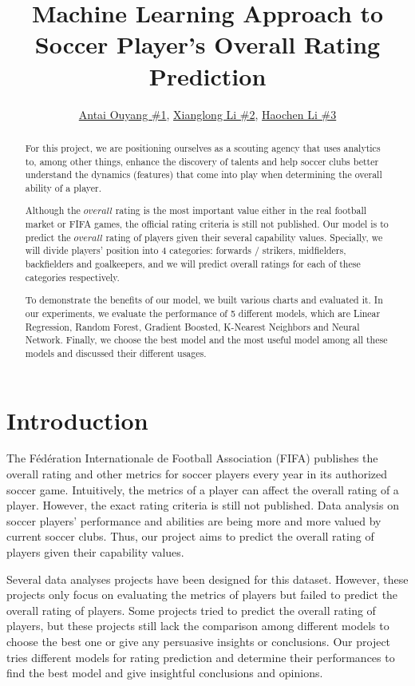 \documentclass{article}
\title{Machine Learning Approach to Soccer Player's Overall Rating Prediction}
\author{\href{mailto:ao2186@nyu.edu}{Antai Ouyang \#1}, \href{mailto:xl3215@nyu.edu}{Xianglong Li \#2}, \href{mailto:hl4151@nyu.edu}{Haochen Li \#3}}
\date{\vspace{-5ex}} %
\begin{document}
\maketitle
\thispagestyle{firstpage}


\begin{abstract}
    
    
    For this project, we are positioning ourselves as a scouting agency that uses analytics to, among other things, enhance the discovery of talents and help soccer clubs better understand the dynamics (features) that come into play when determining the overall ability of a player. 
    
    Although the $overall$ rating is the most important value either in the real football market or FIFA games, the official rating criteria is still not published. Our model is to predict the $overall$ rating of players given their several capability values. Specially, we will divide players' position into 4 categories: forwards / strikers, midfielders, backfielders and goalkeepers, and we will predict overall ratings for each of these categories respectively.
    
    To demonstrate the benefits of our model, we built various charts and evaluated it. In our experiments, we evaluate the performance of 5 different models, which are Linear Regression, Random Forest, Gradient Boosted, K-Nearest Neighbors and Neural Network. Finally, we choose the best model and the most useful model among all these models and discussed their different usages.
    
\end{abstract}


\section*{Introduction}
The Fédération Internationale de Football Association (FIFA) publishes the overall rating and other metrics for soccer players every year in its authorized soccer game. Intuitively, the metrics of a player can affect the overall rating of a player. However, the exact rating criteria is still not published. Data analysis on soccer players' performance and abilities are being more and more valued by current soccer clubs. Thus, our project aims to predict the overall rating of players given their capability values.

Several data analyses projects have been designed for this dataset. However, these projects only focus on evaluating the metrics of players but failed to predict
the overall rating of players. Some projects tried to predict the overall rating of players, but these projects still lack the comparison among different models
to choose the best one or give any persuasive insights or conclusions. Our project tries different models for rating prediction and determine their performances to find the best model and give insightful conclusions and opinions.
\end{document}
